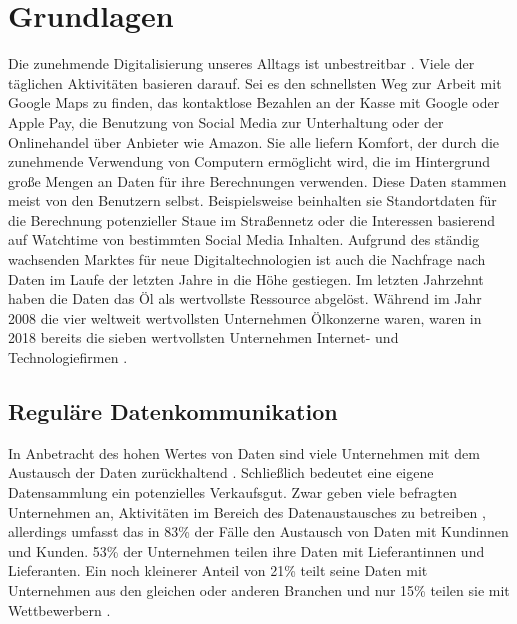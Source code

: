 \documentclass[
	fontsize=11pt,
	headings=small,
	parskip=half,           %
	bibliography=totoc,
	numbers=noenddot,       %
	open=any,               %
]{scrreprt}
\begin{document}
\chapter{Grundlagen}
\label{chap:basics}
Die zunehmende Digitalisierung unseres Alltags ist unbestreitbar \cite{dt-digitalisierung-stat}. Viele der täglichen Aktivitäten basieren darauf. Sei es den schnellsten Weg zur Arbeit mit Google Maps zu finden, das kontaktlose Bezahlen an der Kasse mit Google oder Apple Pay, die Benutzung von Social Media zur Unterhaltung oder der Onlinehandel über Anbieter wie Amazon. Sie alle liefern Komfort, der durch die zunehmende Verwendung von Computern ermöglicht wird, die im Hintergrund große Mengen an Daten für ihre Berechnungen verwenden. Diese Daten stammen meist von den Benutzern selbst. Beispielsweise beinhalten sie Standortdaten für die Berechnung potenzieller Staue im Straßennetz \cite{dt-googlemaps-staus} oder die Interessen basierend auf Watchtime von bestimmten Social Media Inhalten. Aufgrund des ständig wachsenden Marktes für neue Digitaltechnologien ist auch die Nachfrage nach Daten im Laufe der letzten Jahre in die Höhe gestiegen. Im letzten Jahrzehnt haben die Daten das Öl als wertvollste Ressource abgelöst. Während im Jahr 2008 die vier weltweit wertvollsten Unternehmen Ölkonzerne waren, waren in 2018 bereits die sieben wertvollsten Unternehmen Internet- und Technologiefirmen \cite{dt-falck2020rohstoff}. 

\section{Reguläre Datenkommunikation}
In Anbetracht des hohen Wertes von Daten sind viele Unternehmen mit dem Austausch der Daten zurückhaltend \cite{dt-lipovetskajabusiness}. Schließlich bedeutet eine eigene Datensammlung ein potenzielles Verkaufsgut. Zwar geben viele befragten Unternehmen an, Aktivitäten im Bereich des Datenaustausches zu betreiben \cite{dt-fedkenhauer2017datenaustausch}, allerdings umfasst das in 83\% der Fälle den Austausch von Daten mit Kundinnen und Kunden. 53\% der Unternehmen teilen ihre Daten mit Lieferantinnen und Lieferanten. Ein noch kleinerer Anteil von 21\% teilt seine Daten mit Unternehmen aus den gleichen oder anderen Branchen und nur 15\% teilen sie mit Wettbewerbern \cite{dt-fedkenhauer2017datenaustausch}.
\end{document}
